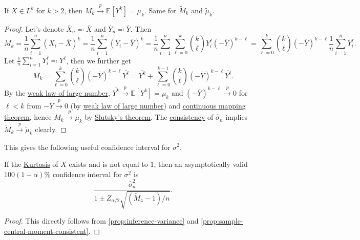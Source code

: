 \begin{proposition}\label{prop:sample-central-moment-consistent}
	If \(X \in L^k\) for \(k > 2\), then \(M_k \overset{p}{\to} \mathbb{E}_{}[Y^k] = \mu _k\). Same for \(\widetilde{M} _k\) and \(\widetilde{\mu} _k\).
\end{proposition}
\begin{proof}
	Let's denote \(\overline{X} _n \eqqcolon \overline{X} \) and \(\overline{Y} _n \eqqcolon \overline{Y} \). Then
	\[
		M_k
		= \frac{1}{n} \sum_{i=1}^{n} (X_i - \overline{X} )^k
		= \frac{1}{n} \sum_{i=1}^{n} (Y_i - \overline{Y} )^k
		= \frac{1}{n} \sum_{i=1}^{n} \sum_{\ell =0}^{k} \binom{k}{\ell } Y_i^{\ell } (-\overline{Y} )^{k-\ell }
		= \sum_{\ell =0}^{k} \binom{k}{\ell } (-\overline{Y} )^{k - \ell } \frac{1}{n} \sum_{i=1}^{n} Y_i^{\ell }.
	\]
	Let \(\frac{1}{n} \sum_{i=1}^{n} Y_i^{\ell } \eqqcolon \overline{Y^{\ell } } \), then we further get
	\begin{equation}\label{eq:sample-central-moment}
		M_k
		= \sum_{\ell =0}^{k} \binom{k}{\ell } (- \overline{Y} )^{k - \ell } \overline{Y^{\ell } }
		= \overline{Y^k} + \sum_{\ell =0}^{k-1} \binom{k}{\ell } (-\overline{Y} )^{k-\ell }  \overline{Y^{\ell } }.
	\end{equation}
	By the \hyperref[thm:WLLN]{weak law of large number}, \(\overline{Y^k} \overset{p}{\to} \mathbb{E}_{}[Y^k] = \mu _k\) and \((-\overline{Y} )^{k-\ell } \overset{p}{\to} 0\) for \(\ell < k\) from \(-\overline{Y} \overset{p}{\to} 0\) (by \hyperref[thm:WLLN]{weak law of large number}) and \hyperref[thm:continuous-mapping]{continuous mapping theorem}, hence \(M_k \overset{p}{\to} \mu _k\) by \hyperref[col:Slutsky]{Slutsky's theorem}. The \hyperref[def:consistent]{consistency} of \(\hat{\sigma} _n\) implies \(\widetilde{M} _k \overset{p}{\to} \widetilde{\mu} _k\) clearly.
\end{proof}

This gives the following useful confidence interval for \(\sigma ^2\).

\begin{corollary}\label{col:inference-variance-CI}
	If the \hyperref[def:Kurtosis]{Kurtosis} of \(X\) exists and is not equal to \(1\), then an asymptotically valid \(100 (1 - \alpha )\%\) confidence interval for \(\sigma ^2\) is
	\[
		\frac{\hat{\sigma} _n^2}{1 \pm Z_{\alpha / 2} \sqrt{(\widetilde{M} _4 - 1) / n} }.
	\]
\end{corollary}
\begin{proof}
	This directly follows from \autoref{prop:inference-variance} and \autoref{prop:sample-central-moment-consistent}.
\end{proof}

